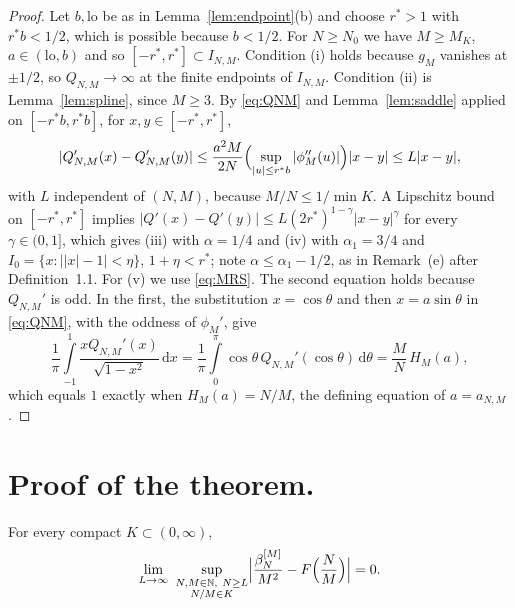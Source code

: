 \documentclass{math}
\let\TJMoriginalint\int
\renewcommand{\int}{\TJMoriginalint\limits}
\newcommand{\N}{\mathbb N}
\newcommand{\dd}{\,\mathrm d}
\begin{document}
\begin{proof}
Let $b,\mathrm{lo}$ be as in Lemma~\ref{lem:endpoint}(b) and choose $r^*>1$ with $r^*b<1/2$, which is possible because $b<1/2$. For $N\ge N_0$ we have $M\ge M_K$, $a\in(\mathrm{lo},b)$ and so $[-r^*,r^*]\subset I_{N,M}$. Condition (i) holds because $g_M$ vanishes at $\pm1/2$, so $Q_{N,M}\to\infty$ at the finite endpoints of $I_{N,M}$. Condition (ii) is Lemma~\ref{lem:spline}, since $M\ge3$. By \eqref{eq:QNM} and Lemma~\ref{lem:saddle} applied on $[-r^*b,r^*b]$, for $x,y\in[-r^*,r^*]$,
\begin{equation}\label{eq:Lip}
|Q_{N,M}'(x)-Q_{N,M}'(y)|\le\frac{a^2M}{2N}\Bigl(\sup_{|u|\le r^*b}|\phi_M''(u)|\Bigr)|x-y|\le L|x-y| ,
\end{equation}
with $L$ independent of $(N,M)$, because $M/N\le1/\min K$. A Lipschitz bound on $[-r^*,r^*]$ implies $|Q'(x)-Q'(y)|\le L(2r^*)^{1-\gamma}|x-y|^\gamma$ for every $\gamma\in(0,1]$, which gives (iii) with $\alpha=1/4$ and (iv) with $\alpha_1=3/4$ and $I_0=\{x:\bigl||x|-1\bigr|<\eta\}$, $1+\eta<r^*$; note $\alpha\le\alpha_1-1/2$, as in Remark~(e) after Definition~1.1. For (v) we use \eqref{eq:MRS}. The second equation holds because $Q_{N,M}'$ is odd. In the first, the substitution $x=\cos\theta$ and then $x=a\sin\theta$ in \eqref{eq:QNM}, with the oddness of $\phi_M'$, give
\begin{equation}\label{eq:MRSreduce}
\frac1\pi\int_{-1}^1\frac{xQ_{N,M}'(x)}{\sqrt{1-x^2}}\dd x=\frac1\pi\int_0^\pi\cos\theta\,Q_{N,M}'(\cos\theta)\dd\theta=\frac MN\,H_M(a),
\end{equation}
which equals $1$ exactly when $H_M(a)=N/M$, the defining equation of $a=a_{N,M}$.
\end{proof}

\section{Proof of the theorem.}\label{sec:proof}
\begin{theorem}\label{thm:main}
For every compact $K\subset(0,\infty)$,
\begin{equation}\label{eq:main}
\lim_{L\to\infty}\ \sup_{\substack{N,M\in\N,\ N\ge L\\ N/M\in K}}\Bigl|\frac{\beta_N^{[M]}}{M^2}-F\Bigl(\frac NM\Bigr)\Bigr|=0 .
\end{equation}
\end{theorem}
\end{document}
